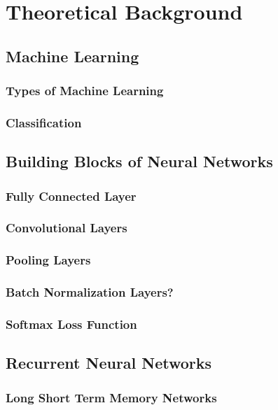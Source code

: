 \section{Theoretical Background}
\label{sec:theoretical_background}

\subsection{Machine Learning}
\subsubsection{Types of Machine Learning}
\subsubsection{Classification}

\subsection{Building Blocks of Neural Networks}

\subsubsection{Fully Connected Layer}
\subsubsection{Convolutional Layers}
\subsubsection{Pooling Layers}
\subsubsection{Batch Normalization Layers?}
\subsubsection{Softmax Loss Function}

\subsection{Recurrent Neural Networks}
\subsubsection{Long Short Term Memory Networks}

